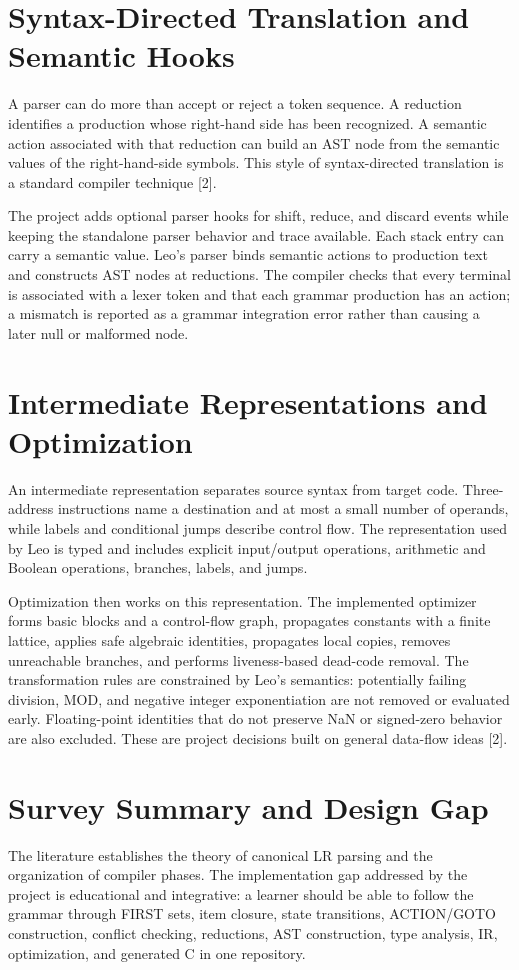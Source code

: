 \documentclass[12pt,a4paper,oneside]{report}
\begin{document}
\section{Syntax-Directed Translation and Semantic Hooks}
A parser can do more than accept or reject a token sequence. A reduction identifies a production whose right-hand side has been recognized. A semantic action associated with that reduction can build an AST node from the semantic values of the right-hand-side symbols. This style of syntax-directed translation is a standard compiler technique [2].

The project adds optional parser hooks for shift, reduce, and discard events while keeping the standalone parser behavior and trace available. Each stack entry can carry a semantic value. Leo's parser binds semantic actions to production text and constructs AST nodes at reductions. The compiler checks that every terminal is associated with a lexer token and that each grammar production has an action; a mismatch is reported as a grammar integration error rather than causing a later null or malformed node.

\section{Intermediate Representations and Optimization}
An intermediate representation separates source syntax from target code. Three-address instructions name a destination and at most a small number of operands, while labels and conditional jumps describe control flow. The representation used by Leo is typed and includes explicit input/output operations, arithmetic and Boolean operations, branches, labels, and jumps.

Optimization then works on this representation. The implemented optimizer forms basic blocks and a control-flow graph, propagates constants with a finite lattice, applies safe algebraic identities, propagates local copies, removes unreachable branches, and performs liveness-based dead-code removal. The transformation rules are constrained by Leo's semantics: potentially failing division, MOD, and negative integer exponentiation are not removed or evaluated early. Floating-point identities that do not preserve NaN or signed-zero behavior are also excluded. These are project decisions built on general data-flow ideas [2].

\section{Survey Summary and Design Gap}
The literature establishes the theory of canonical LR parsing and the organization of compiler phases. The implementation gap addressed by the project is educational and integrative: a learner should be able to follow the grammar through FIRST sets, item closure, state transitions, ACTION/GOTO construction, conflict checking, reductions, AST construction, type analysis, IR, optimization, and generated C in one repository.
\end{document}
